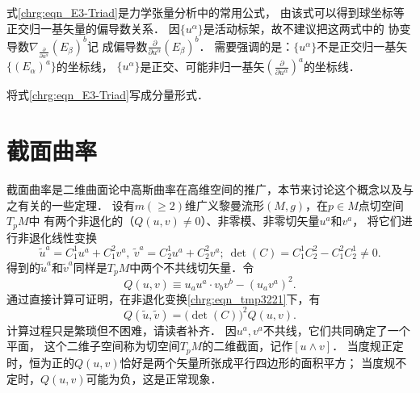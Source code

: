 式\eqref{chrg:eqn_E3-Triad}是力学张量分析中的常用公式，
由该式可以得到球坐标等正交归一基矢量的偏导数关系．
因$\{u^\alpha\}$是活动标架，故不建议把这两式中的
协变导数$\nabla _{\frac{\partial }{\partial u^\alpha}} (E_\beta)^b$记
成偏导数$\frac{\partial }{\partial u^\alpha} (E_\beta)^b$．
需要强调的是：$\{u^\alpha\}$不是正交归一基矢$\{(E_\alpha)^a\}$的坐标线，
$\{u^\alpha\}$是正交、可能非归一基矢$(\frac{\partial }{\partial u^\alpha})^a$的坐标线．




\begin{exercise}
	将式\eqref{chrg:eqn_E3-Triad}写成分量形式．
\end{exercise}



\section{截面曲率}\label{chrg:sec_sectional-curvature}
截面曲率是二维曲面论中高斯曲率在高维空间的推广，本节来讨论这个概念以及与之有关的一些定理．
设有$m(\geqslant 2)$维广义黎曼流形$(M,g)$，在$p\in M$点切空间$T_pM$中
有两个非退化的（$Q(u,v)\neq0$）、非零模、非零切矢量$u^a$和$v^a$，
将它们进行非退化线性变换
\begin{equation}\label{chrg:eqn_tmp3221}
    \tilde{u}^a = C_1^1 u^a +C_1^2 v^a, \ \tilde{v}^a = C_2^1 u^a +C_2^2 v^a;
    \ \det(C) = C_1^1C_2^2 - C_1^2 C^1_2\neq 0 .
\end{equation}
得到的$\tilde{u}^a$和$\tilde{v}^a$同样是$T_pM$中两个不共线切矢量．令
\begin{equation}\label{chrg:eqn_tmp3222}
    Q(u,v)\equiv {u}_a{u}^a \cdot {v}_b{v}^b - ({u}_a{v}^a)^2 .
\end{equation}
通过直接计算可证明，在非退化变换\eqref{chrg:eqn_tmp3221}下，有
\begin{equation}\label{chrg:eqn_tmp3223}
    Q(\tilde{u},\tilde{v}) = \bigl(\det(C)\bigr)^2 Q(u,v) .
\end{equation}
计算过程只是繁琐但不困难，请读者补齐．
因$u^a,v^a$不共线，它们共同确定了一个平面，
这个二维子空间称为切空间$T_pM$的{\heiti 二维截面}，记作$[u\wedge v]$．
当度规正定时，恒为正的$Q(u,v)$恰好是两个矢量所张成平行四边形的面积平方；
当度规不定时，$Q(u,v)$可能为负，这是正常现象．

